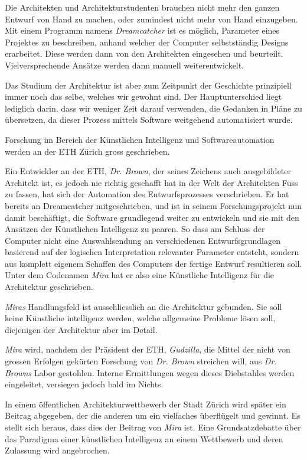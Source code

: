 \documentclass[11pt,a4paper,ngerman]{scrreprt}
\begin{document}
Die Architekten und Architekturstudenten brauchen nicht mehr den ganzen
Entwurf von Hand zu machen, oder zumindest nicht mehr von Hand
einzugeben. Mit einem Programm namens \emph{Dreamcatcher} ist es möglich,
Parameter eines Projektes zu beschreiben, anhand welcher der Computer
selbstständig Designs erarbeitet. Diese werden dann von den Architekten
eingesehen und beurteilt. Vielversprechende Ansätze werden dann manuell
weiterentwickelt.

Das Studium der Architektur ist aber zum Zeitpunkt der Geschichte prinzipiell
immer noch das selbe, welches wir gewohnt sind. Der Hauptunterschied liegt
lediglich darin, dass wir weniger Zeit darauf verwenden, die Gedanken in
Pläne zu übersetzen, da dieser Prozess mittels Software weitgehend
automatisiert wurde.

Forschung im Bereich der Künstlichen Intelligenz und Softwareautomation
werden an der ETH Zürich gross geschrieben.

Ein Entwickler an der ETH, \emph{Dr. Brown}, der seines Zeichens auch
ausgebildeter Architekt ist, es jedoch nie richtig geschafft hat in der Welt
der Architekten Fuss zu fassen, hat sich der Automation des Entwurfsprozesses
verschrieben. Er hat bereits an Dreamcatcher mitgeschrieben, und ist in
seinem Forschungsprojekt nun damit beschäftigt, die Software grundlegend
weiter zu entwickeln und sie mit den Ansätzen der Künstlichen Intelligenz zu
paaren. So dass am Schluss der Computer nicht eine Auswahlsendung an
verschiedenen Entwurfsgrundlagen basierend auf der logischen Interpretation
relevanter Parameter entsteht, sondern aus komplett eigenem Schaffen des
Computers der fertige Entwurf resultieren soll. Unter dem Codenamen \emph{Mira}
hat er also eine Künstliche Intelligenz für die Architektur geschrieben.

\emph{Miras} Handlungsfeld ist ausschliesslich an die Architektur gebunden. Sie
soll keine Künstliche intelligenz werden, welche allgemeine Probleme lösen
soll, diejenigen der Architektur aber im Detail.

\emph{Mira} wird, nachdem der Präsident der ETH, \emph{Gudzilla}, die Mittel der nicht
von grossen Erfolgen gekürten Forschung von \emph{Dr. Brown} streichen will, aus
\emph{Dr. Browns} Labor gestohlen. Interne Ermittlungen wegen dieses Diebstahles
werden eingeleitet, versiegen jedoch bald im Nichts.

In einem öffentlichen Architekturwettbewerb der Stadt Zürich wird später ein
Beitrag abgegeben, der die anderen um ein vielfaches überflügelt und
gewinnt. Es stellt sich heraus, dass dies der Beitrag von \emph{Mira} ist. Eine
Grundsatzdebatte über das Paradigma einer künstlichen Intelligenz an einem
Wettbewerb und deren Zulassung wird angebrochen.
\end{document}
